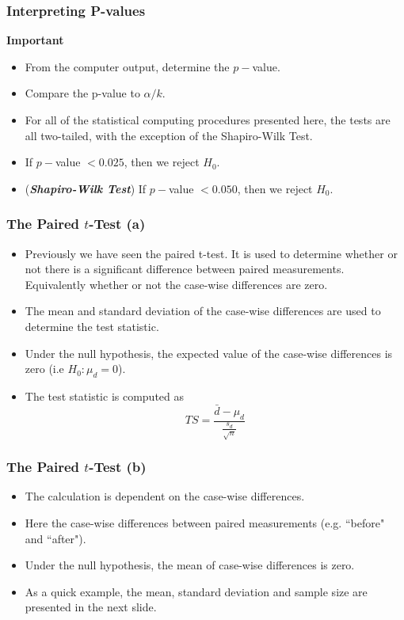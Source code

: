\documentclass[a4]{beamer}
\begin{document}
\begin{frame}
	\frametitle{Interpreting P-values}
	\textbf{Important}
	\begin{itemize}
		\item From the computer output, determine the $p-$value. \smallskip 
		\item Compare the p-value to $\alpha/k$. \smallskip 
		\item For all of the statistical computing procedures presented here, the tests are all two-tailed, with the exception of the Shapiro-Wilk Test. \smallskip 
		\item If $p-$value $< 0.025$, then we reject $H_0$. \smallskip 
		\item (\textbf{\textit{Shapiro-Wilk Test}}) If $p-$value $< 0.050$, then we reject $H_0$.
	\end{itemize}
\end{frame}	

\begin{frame}
\frametitle{The Paired $t$-Test (a)}

\begin{itemize}
\item Previously we have seen the paired t-test. It is used to determine whether or
not there is a significant difference between paired measurements. Equivalently whether or not
the case-wise differences are zero.
\item The mean and standard deviation of the case-wise differences are used to determine the test statistic.
\item Under the null hypothesis, the expected value of the case-wise differences is zero (i.e $H_0 : \mu_d = 0$).
\item The test statistic is computed as
\[ TS = \frac{\bar{d} - \mu_d}{\frac{s_d}{\sqrt{n}}} \]
\end{itemize}
\end{frame}


\begin{frame}[fragile]
\frametitle{The Paired $t$-Test (b)}
\begin{itemize}
\item The calculation is dependent on the case-wise differences.
\item Here the case-wise differences between paired measurements (e.g. ``before" and ``after").
\item Under the null hypothesis, the mean of case-wise differences is zero.
\item As a quick example, the mean, standard deviation and sample size are presented in the next slide.
\end{itemize}
\end{frame}
\end{document}
